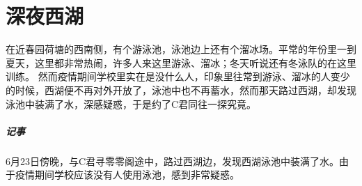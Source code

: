 \chapter{深夜西湖}

在近春园荷塘的西南侧，有个游泳池，泳池边上还有个溜冰场。平常的年份里一到夏天，这里都非常热闹，许多人来这里游泳、溜冰；冬天听说还有冬泳队的在这里训练。
然而疫情期间学校里实在是没什么人，印象里往常到游泳、溜冰的人变少的时候，西湖便不再对外开放了，泳池中也不再蓄水，然而那天路过西湖，却发现泳池中装满了水，深感疑惑，于是约了C君同往一探究竟。


\paragraph{记事}
6月23日傍晚，与C君寻零零阁途中，路过西湖边，发现西湖泳池中装满了水。由于疫情期间学校应该没有人使用泳池，感到非常疑惑。
